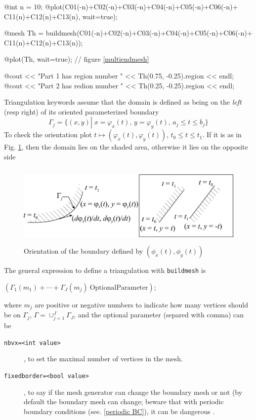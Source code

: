\documentclass[a4paper,twoside,12pt]{book}
\begin{document}
@int n = 10;
@plot(C01(-n)+C02(-n)+C03(-n)+C04(-n)+C05(-n)+C06(-n)+
      C11(n)+C12(n)+C13(n), wait=true);

@mesh Th = buildmesh(C01(-n)+C02(-n)+C03(-n)+C04(-n)+C05(-n)+C06(-n)+
      C11(n)+C12(n)+C13(n));

@plot(Th, wait=true); // figure \ref{multiendmesh}

@cout << "Part 1 has region number " << Th(0.75, -0.25).region << endl;
@cout << "Part 2 has redion number " << Th(0.25, -0.25).region << endl;
\eFF


Triangulation keywords assume that the domain is defined as being on the \emph{left} (resp right) of its
oriented parameterized boundary
$$
\Gamma_j=\{(x,y)\left|\; x=\varphi_x(t),\, y=\varphi_y(t),\, a_j\le t\le b_j\right.\}
$$
To check the orientation plot
$t\mapsto (\varphi_x(t),\varphi_y(t)),\, t_0\le t\le t_1$.
If it is as in Fig. \ref{fig:border}, then
the domain lies on the shaded area, otherwise it lies on the opposite side


\begin{figure}[htbp]
\begin{center}
  \includegraphics[height=4cm]{border}
\end{center}
  \caption{Orientation of the boundary defined by $(\phi_x(t),\phi_y(t))$
  \label{fig:border}} 
\end{figure}
The general expression to define a triangulation with \texttt{buildmesh} is
\begin{center}
$\left(\Gamma_1(m_1)+\cdots+\Gamma_J(m_j) \mathrm{~OptionalParameter} \right)$;
\end{center}
where $m_j$ are positive or negative numbers to indicate how many vertices should be on $\Gamma_j,\,
\Gamma=\cup_{j=1}^J \Gamma_J$, and the optional parameter (separed with comma) can be
\begin{description}
\item[\texttt{nbvx=<int value>}] ,  to set the maximal number of  vertices in the mesh.
\item[\texttt{fixedborder=<bool value>}] , to say if the mesh generator can change the boundary mesh
or not (by default the boundary mesh can change; beware that with periodic boundary conditions 
(see. \ref{periodic BC}), it can be dangerous .\label{buildmesh fixedborder}
\end{description}
\end{document}
